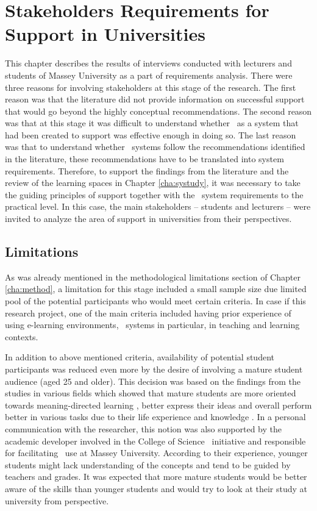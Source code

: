 \chapter{Stakeholders Requirements for \LLLc Support in Universities
\label{cha:model}}
This chapter describes the results of interviews conducted with lecturers and
students of Massey University as a part of \LLLs requirements analysis. There
were three reasons for involving stakeholders at this stage of the research. The
first reason was that the literature did not provide information on successful
\LLLs support that would go beyond the highly conceptual recommendations. The
second reason was that at this stage it was difficult to understand whether
\ep~as a system that had been created to support \LLLs was effective enough in
doing so. The last reason was that to understand whether \ep~systems follow the
recommendations identified in the literature, these recommendations have to be
translated into system requirements. Therefore, to support the findings from the
literature and the review of the learning spaces in Chapter \ref{cha:systudy},
it was necessary to take the guiding principles of \LLLs support together with
the \ep~system requirements to the practical level. In this case, the main
stakeholders -- students and lecturers -- were invited to analyze the area of
\LLLs support in universities from their perspectives.

\section{Limitations}

As was already mentioned in the methodological limitations section of Chapter
\ref{cha:method}, a limitation for this stage included a small sample size due
limited pool of the potential participants who would meet certain criteria. In
case if this research project, one of the main criteria included having prior
experience of using e-learning environments, \ep~systems in particular, in
teaching and learning contexts.

In addition to above mentioned criteria, availability of potential student
participants was reduced even more by the desire of involving a mature student
audience (aged 25 and older). This decision was based on the findings from the
studies in various fields which showed that mature students are more oriented
towards meaning-directed learning \citep{Smith2010}, better express their ideas
\citep{Lea2010} and overall perform better in various tasks due to their life
experience and knowledge \citep{Sherwood1987}. In a personal communication with
the researcher, this notion was also supported by the academic developer
involved in the College of Science \ep~initiative and responsible for
facilitating \ep~use at Massey University. According to their experience,
younger students might lack understanding of the \LLLs concepts and tend to be
guided by teachers and grades. It was expected that more mature students would
be better aware of the \LLLs skills than younger students and would try to look
at their study at university from \LLLs perspective.

